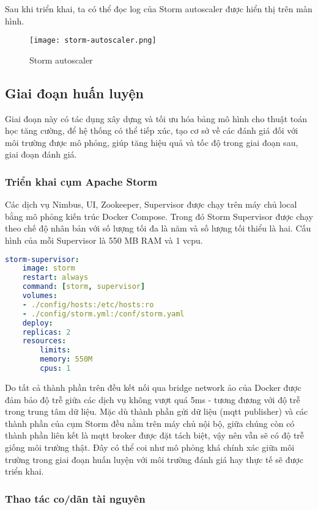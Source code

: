 Sau khi triển khai, ta có thể đọc log của Storm autoscaler được hiển thị trên màn hình.

\begin{figure}[H]
    \centering
    \texttt{[image: storm-autoscaler.png]}
    \caption{Storm autoscaler}
\end{figure}

\subsection{Giai đoạn huấn luyện}

Giai đoạn này có tác dụng xây dựng và tối ưu hóa bảng mô hình cho thuật toán học tăng cường, để hệ thống có thể tiếp xúc, tạo cơ sở về các đánh giá đối với môi trường được mô phỏng, giúp tăng hiệu quả và tốc độ trong giai đoạn sau, giai đoạn đánh giá.

\subsubsection{Triển khai cụm Apache Storm}

Các dịch vụ Nimbus, UI, Zookeeper, Supervisor được chạy trên máy chủ local bằng mô phỏng kiến trúc Docker Compose. Trong đó Storm Supervisor được chạy theo chế độ nhân bản với số lượng tối đa là năm và số lượng tối thiểu là hai. Cấu hình của mỗi Supervisor là 550 MB RAM và 1 v\gls{cpu}.

\begin{lstlisting}[language=yaml, caption={Cấu hình của các supervisor}]
storm-supervisor:
    image: storm
    restart: always
    command: [storm, supervisor]
    volumes:
    - ./config/hosts:/etc/hosts:ro
    - ./config/storm.yml:/conf/storm.yaml
    deploy:
    replicas: 2
    resources:
        limits:
        memory: 550M
        cpus: 1
\end{lstlisting}

Do tất cả thành phần trên đều kết nối qua bridge network ảo của Docker được đảm bảo độ trễ giữa các dịch vụ không vượt quá 5ms - tương đương với độ trễ trong trung tâm dữ liệu. Mặc dù thành phần gửi dữ liệu (\gls{mqtt} publisher) và các thành phần của cụm Storm đều nằm trên máy chủ nội bộ, giữa chúng còn có thành phần liên kết là \gls{mqtt} broker được đặt tách biệt, vậy nên vẫn sẽ có độ trễ giống môi trường thật. Đây có thể coi như mô phỏng khá chính xác giữa môi trường trong giai đoạn huấn luyện với môi trường đánh giá hay thực tế sẽ được triển khai.

\subsubsection{Thao tác co/dãn tài nguyên}

